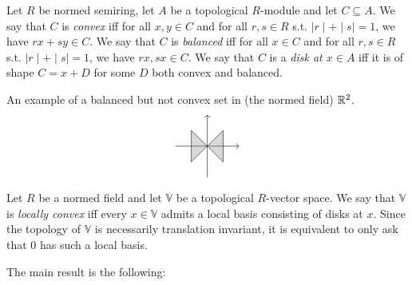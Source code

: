 \begin{definition}
 Let $R$ be normed semiring, let $A$ be a topological $R$-module and let $C\subseteq A$.
 We say that $C$ is \emph{convex} iff for all $x,y\in C$ and for all $r,s\in R$ s.t. $\mid r\mid +\mid s\mid =1$, we have $rx+sy\in C$.
 We say that $C$ is \emph{balanced} iff for all $x\in C$ and for all $r,s\in R$ s.t. $\mid r\mid +\mid s\mid =1$, we have $rx,sx\in C$.
 We say that $C$ is a \emph{disk at $x\in A$} iff it is of shape $C=x+D$ for some $D$ both convex and balanced.
\end{definition}

\begin{example}
 An example of a balanced but not convex set in (the normed field) $\mathbb{R}^2$.
 \[\begin{tikzpicture}
 \draw[->] (0,-1) -- (0,1);
 \draw[->] (-1,0) -- (1,0);
 \draw[fill=gray, fill opacity=0.3] (0,0) -- (0.5,-0.5) -- (0.5,0.5) -- (0,0) -- (-0.5,0.5) -- (-0.5,-0.5) -- cycle;
\end{tikzpicture}\]
\end{example}

\begin{definition}
 Let $R$ be a normed field and let $\mathbb{V}$ be a topological $R$-vector space. We say that $\mathbb{V}$ is \emph{locally convex} iff every $x\in \mathbb{V}$ admits a local basis consisting of disks at $x$.
 Since the topology of $\mathbb{V}$ is necessarily translation invariant,
 it is equivalent to only ask that $0$ has such a local basis.
\end{definition}

The main result is the following:


